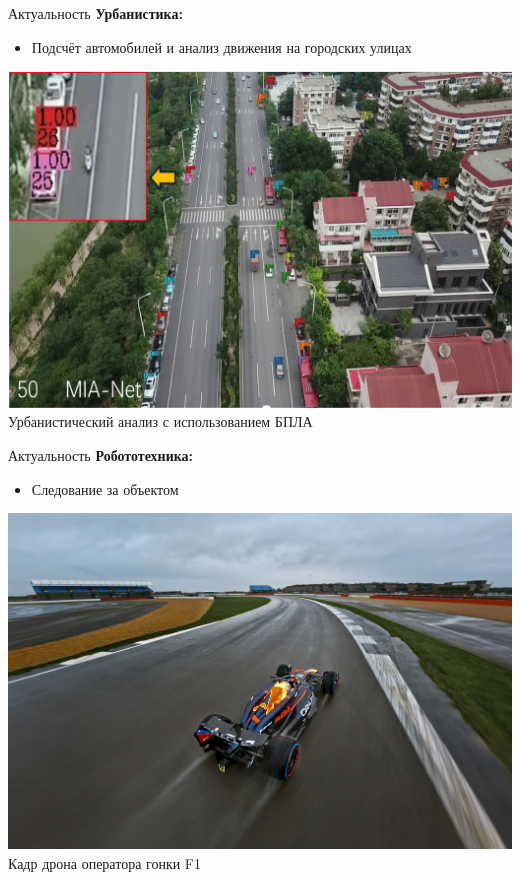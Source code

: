 \documentclass{beamer} %
\begin{document}
\begin{frame}{Актуальность}
  \textbf{Урбанистика:}
  \begin{itemize}
    \item Подсчёт автомобилей и анализ движения на городских улицах
  \end{itemize}
  \vspace{0.5cm}
  \centering
  \includegraphics[width=0.7\linewidth]{review/urban_uav.png}\\
  \small Урбанистический анализ с использованием БПЛА
\end{frame}

\begin{frame}{Актуальность}
  \textbf{Робототехника:}
  \begin{itemize}
    \item Следование за объектом
  \end{itemize}
  \vspace{0.5cm}
  \centering
  \includegraphics[width=0.7\linewidth]{presentation/f1_car.jpg}\\
  \small Кадр дрона оператора гонки F1
\end{frame}
\end{document}
